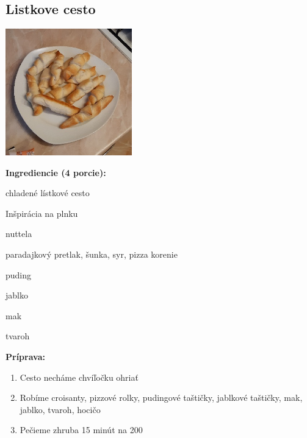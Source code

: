 \setcounter{step}{0}

\subsection{ Listkove cesto }

\begin{ingredient}
  
      \includegraphics[height=5.5cm]{images/listkove_cesto}
  
  \def\portions{  }
  \textbf{ {\normalsize Ingrediencie (4 porcie):} }

  \begin{main}
      \item chladené lístkové cesto
  \end{main}
  
    \begin{subingredient}{Inšpirácia na plnku}
        \item nuttela
        \item paradajkový pretlak, šunka, syr, pizza korenie
        \item puding
        \item jablko
        \item mak
        \item tvaroh
    \end{subingredient}
  
\end{ingredient}
\begin{recipe}
\textbf{ {\normalsize Príprava:} }
\begin{enumerate}

  \item{Cesto necháme chvíľočku ohriať}
  \item{Robíme croisanty, pizzové rolky, pudingové taštičky, jablkové taštičky, mak, jablko, tvaroh, hocičo}
  \item{Pečieme zhruba 15 minút na 200}

\end{enumerate}
\end{recipe}

\begin{notes}
  
\end{notes}	
\clearpage
